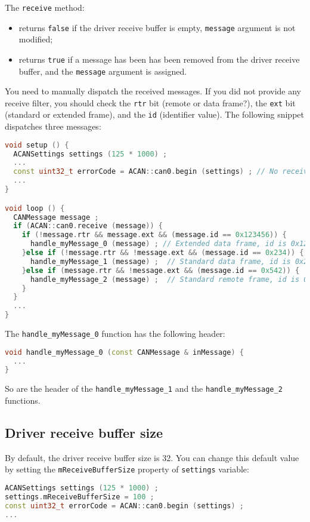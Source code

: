 \documentclass[9pt, a4paper, obeyspaces, openany]{extarticle}
\newcommand \subsectionLabel[2]{\subsection{#1}\label{subsec:#2}}
\begin{document}
The \texttt{receive} method:
\begin{itemize}
  \item returns \texttt{false} if the driver receive buffer is empty, \texttt{message} argument is not modified;
  \item returns \texttt{true} if a message has been has been removed from the driver receive buffer, and the \texttt{message} argument is assigned.
\end{itemize}

You need to manually dispatch the received messages. If you did not provide any receive filter, you should check the \texttt{rtr} bit (remote or data frame?), the \texttt{ext} bit (standard or extended frame), and the \texttt{id} (identifier value). The following snippet dispatches three messages:
{ \small\begin{lstlisting}[language=c++]
void setup () {
  ACANSettings settings (125 * 1000) ;
  ...
  const uint32_t errorCode = ACAN::can0.begin (settings) ; // No receive filter
  ...
}

void loop () {
  CANMessage message ;
  if (ACAN::can0.receive (message)) {
    if (!message.rtr && message.ext && (message.id == 0x123456)) {
      handle_myMessage_0 (message) ; // Extended data frame, id is 0x123456
    }else if (!message.rtr && !message.ext && (message.id == 0x234)) {
      handle_myMessage_1 (message) ;  // Standard data frame, id is 0x234
    }else if (message.rtr && !message.ext && (message.id == 0x542)) {
      handle_myMessage_2 (message) ;  // Standard remote frame, id is 0x542
    }
  }
  ...
}
\end{lstlisting}}

The \texttt{handle\_myMessage\_0} function has the following header:

{ \small\begin{lstlisting}[language=c++]
void handle_myMessage_0 (const CANMessage & inMessage) {
  ...
}
\end{lstlisting}}

So are the header of the \texttt{handle\_myMessage\_1} and the \texttt{handle\_myMessage\_2} functions.




\subsectionLabel{Driver receive buffer size}{driverReceiveBufferSize}

By default, the driver receive buffer size is 32.  You can change this default value by setting the \texttt{mReceiveBufferSize} property of \texttt{settings} variable:

{ \small\begin{lstlisting}[language=c++]
ACANSettings settings (125 * 1000) ;
settings.mReceiveBufferSize = 100 ;
const uint32_t errorCode = ACAN::can0.begin (settings) ;
...
\end{lstlisting}}
\end{document}
